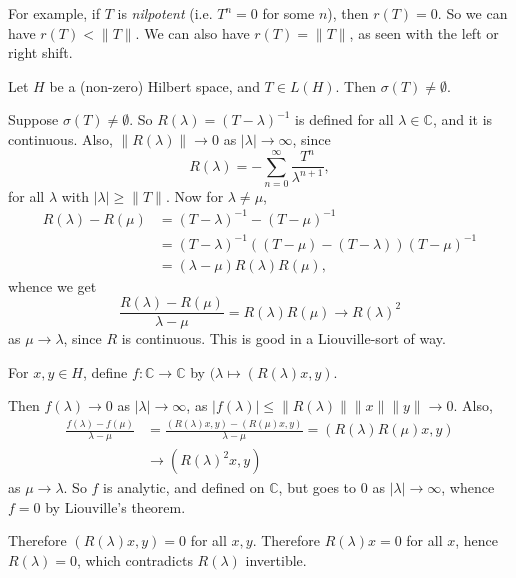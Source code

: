 \documentclass[12pt]{article}
\begin{document}
For example, if $T$ is \emph{nilpotent} (i.e. $T^{n} = 0$ for some $n$), then $r(T) = 0$. So we can have $r(T) < \|T\|$. We can also have $r(T) = \|T\|$, as seen with the left or right shift.

\begin{theorem}
	Let $H$ be a (non-zero) Hilbert space, and $T \in L(H)$. Then $\sigma(T) \neq \emptyset$.
\end{theorem}

\begin{proofbox}
	Suppose $\sigma(T) \neq \emptyset$. So $R(\lambda) = (T - \lambda)^{-1}$ is defined for all $\lambda \in \mathbb{C}$, and it is continuous. Also, $\|R(\lambda)\| \to 0$ as $|\lambda| \to \infty$, since
	\[
	R(\lambda) = - \sum_{n = 0}^{\infty} \frac{T^{n}}{\lambda^{n+1}},
	\]
	for all $\lambda$ with $|\lambda| \geq \|T\|$. Now for $\lambda \neq \mu$,
	\begin{align*}
		R(\lambda) - R(\mu) &= (T - \lambda)^{-1} - (T - \mu)^{-1} \\
				    &= (T - \lambda)^{-1}((T - \mu) - (T - \lambda))(T - \mu)^{-1} \\
				    &= (\lambda - \mu) R(\lambda) R(\mu),
	\end{align*}
	whence we get
	\[
	\frac{R(\lambda) - R(\mu)}{\lambda - \mu} = R(\lambda) R(\mu) \to R(\lambda)^2
	\]
	as $\mu \to \lambda$, since $R$ is continuous. This is good in a Liouville-sort of way.

	For $x, y \in H$, define $f : \mathbb{C} \to \mathbb{C}$ by $(\lambda \mapsto (R(\lambda)x, y)$.

	Then $f(\lambda) \to 0$ as $|\lambda| \to \infty$, as $|f(\lambda)| \leq \|R(\lambda)\| \|x\| \|y\| \to 0$. Also,
	\begin{align*}
		\frac{f(\lambda) - f(\mu)}{\lambda - \mu} &= \frac{(R(\lambda)x, y) - (R(\mu)x, y)}{\lambda - \mu} = (R(\lambda)R(\mu)x, y) \\
							  &\to (R(\lambda)^2 x, y)
	\end{align*}
	as $\mu \to \lambda$. So $f$ is analytic, and defined on $\mathbb{C}$, but goes to $0$ as $|\lambda| \to \infty$, whence $f = 0$ by Liouville's theorem.

	Therefore $(R(\lambda)x, y) = 0$ for all $x, y$. Therefore $R(\lambda) x = 0$ for all $x$, hence $R(\lambda) = 0$, which contradicts $R(\lambda)$ invertible.
\end{proofbox}

\end{document}

